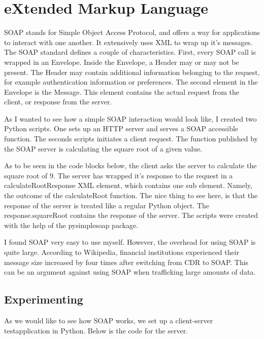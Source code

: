 \section{eXtended Markup Language}
SOAP stands for Simple Object Access Protocol, and offers a way for applications to interact with one another. It extensively uses XML to wrap up it's messages. The SOAP standard defines a couple of characteristics. First, every SOAP call is wrapped in an Envelope. Inside the Envelope, a Header may or may not be present. The Header may contain additional information belonging to the request, for example authentication information or preferences. The second element in the Envelope is the Message. This element contains the actual request from the client, or response from the server.

As I wanted to see how a simple SOAP interaction would look like, I created two Python scripts. One sets up an HTTP server and serves a SOAP accessible function. The seconds scripts initiates a client request. The function published by the SOAP server is calculating the square root of a given value.

As to be seen in the code blocks below, the client asks the server to calculate the square root of 9. The server has wrapped it's response to the request in a calculateRootResponse XML element, which contains one sub element. Namely, the outcome of the calculateRoot function. The nice thing to see here, is that the response of the server is treated like a regular Python object. The response.squareRoot contains the response of the server. The scripts were created with the help of the pysimplesoap package.

I found SOAP very easy to use myself. However, the overhead for using SOAP is quite large. According to Wikipedia, financial institutions experienced their message size increased by four times after switching from CDR to SOAP. This can be an argument against using SOAP when trafficking large amounts of data.

\subsection{Experimenting}
As we would like to see how SOAP works, we set up a client-server testapplication in Python. Below is the code for the server.

